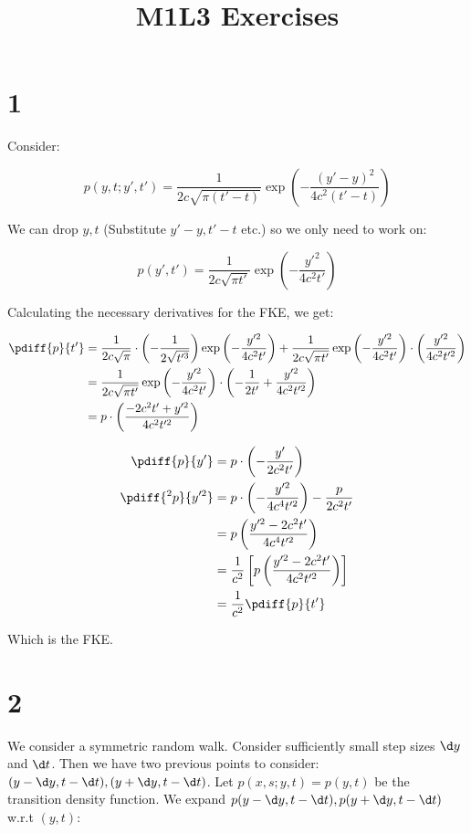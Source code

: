 \documentclass{article}
\begin{document}
	\title{M1L3 Exercises}
	\section*{1}
	Consider:
	
	\begin{equation*}
		p(y,t;y',t') = \frac{1}{2c\sqrt{\pi(t'-t)}}\exp\left(-\frac{(y'-y)^2}{4c^2(t'-t)}\right)
	\end{equation*}
	
	We can drop $y,t$ (Substitute $y'-y,t'-t$ etc.) so we only need to work on:
	
	\begin{equation*}
		p(y',t') = \frac{1}{2c\sqrt{\pi t'}}\exp\left(-\frac{y'^2}{4c^2 t'}\right)
	\end{equation*}
	
	Calculating the necessary derivatives for the FKE, we get:
	
	\begin{align*}
		\pdiff{p}{t'} &= \frac{1}{2c\sqrt{\pi}} \cdot \left(-\frac{1}{2\sqrt{t'^3}}\right)\exp\left(-\frac{y'^2}{4c^2 t'}\right) + \frac{1}{2c\sqrt{\pi t'}}\exp\left(-\frac{y'^2}{4c^2 t'}\right) \cdot \left(\frac{y'^2}{4c^2t'^2}\right) \\
		&= \frac{1}{2c\sqrt{\pi t'}}\exp\left(-\frac{y'^2}{4c^2 t'}\right) \cdot \left(-\frac{1}{2t'} + \frac{y'^2}{4c^2t'^2}\right) \\
		&= p \cdot \left(\frac{-2c^2t'+y'^2}{4c^2t'^2}\right)
	\end{align*}
	
	\begin{align*}
		\pdiff{p}{y'} &= p \cdot \left(-\frac{y'}{2c^2t'}\right) \\
		\pdiff{^2p}{y'^2} &= p \cdot \left(-\frac{y'^2}{4c^4t'^2}\right) - \frac{p}{2c^2t'} \\
		&= p \left(\frac{y'^2-2c^2t'}{4c^4t'^2}\right) \\
		&= \frac{1}{c^2} 
		\left[p \left( \frac{y'^2-2c^2t'}{4c^2t'^2} \right)\right] \\
		&= \frac{1}{c^2} \pdiff{p}{t'}
	\end{align*}
	
	Which is the FKE.
	\section*{2}
	
	We consider a symmetric random walk. Consider sufficiently small step sizes $\d y$ and $\d t$. Then we have two previous points to consider: $(y - \d y, t - \d t), (y + \d y, t - \d t)$. Let $p(x,s;y,t) = p(y,t) $ be the transition density function. We expand $p(y - \d y, t - \d t), p(y + \d y, t - \d t)$ w.r.t $(y,t)$:
	
\end{document}
